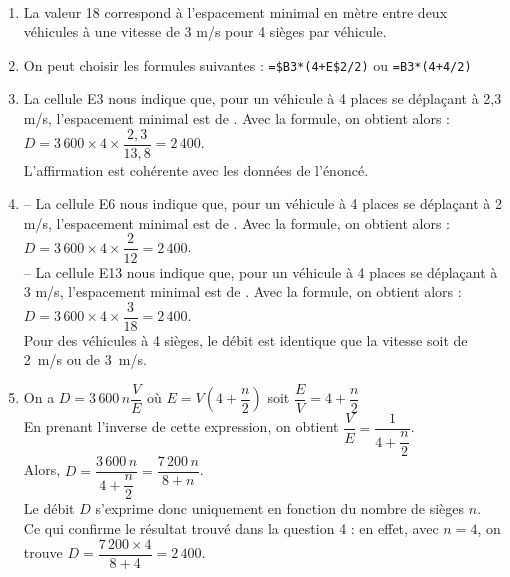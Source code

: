 \ \\ [-5mm]
   \begin{enumerate}
      \item La valeur 18 correspond à {\blue l'espacement minimal en mètre entre deux véhicules à une vitesse de 3 m/s pour 4 sièges par véhicule}.
      \item On peut choisir les formules suivantes : {\blue\texttt{=\$B3*(4+E\$2/2)}} ou {\blue\texttt{=B3*(4+4/2)}}
      \item La cellule E3 nous indique que, pour un véhicule à 4 places se déplaçant à 2,3 m/s, l'espacement minimal est de . Avec la formule, on obtient alors : $D =3\,600\times4\times\dfrac{2,3}{13,8} =2\,400$. \\ [1mm]
         {\blue L'affirmation est cohérente avec les données de l'énoncé}.
      \item -- La cellule E6 nous indique que, pour un véhicule à 4 places se déplaçant à 2 m/s, l'espacement minimal est de . Avec la formule, on obtient alors : $D =3\,600\times4\times\dfrac{2}{12} =2\,400$. \\ [1mm]
         -- La cellule E13 nous indique que, pour un véhicule à 4 places se déplaçant à 3 m/s, l'espacement minimal est de . Avec la formule, on obtient alors : $D =3\,600\times4\times\dfrac{3}{18} =2\,400$. \\ [1mm]
         {\blue Pour des véhicules à 4 sièges, le débit est identique que la vitesse soit de 2~m/s ou de 3~m/s}. \smallskip
      \item On a $D =3\,600\,n\dfrac{V}{E}$ où $E =V\left(4+\dfrac{n}{2}\right)$ soit $\dfrac{E}{V} =4+\dfrac{n}{2}$ \\ [1mm]
         En prenant l'inverse de cette expression, on obtient $\dfrac{V}{E} =\dfrac{1}{4+\dfrac{n}{2}}$. \\ [1mm]
         Alors, $D =\dfrac{3\,600\,n}{4+\dfrac{n}{2}} =\dfrac{7\,200\,n}{8+n}$. \\ [1mm]
         {\blue Le débit $D$ s'exprime donc uniquement en fonction du nombre de sièges $n$}. \\
         Ce qui confirme le résultat trouvé dans la question 4 : en effet, avec $n=4$, on trouve $D =\dfrac{7\,200\times4}{8+4} =2\,400$.
   \end{enumerate}
